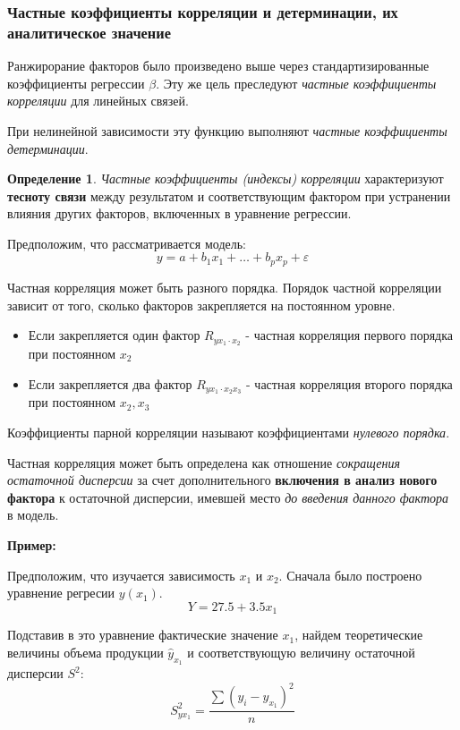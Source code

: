 \documentclass[aps,%
12pt,%
final,%
oneside,
onecolumn,%
musixtex, %
superscriptaddress,%
centertags]{article} %
\theoremstyle{plain}
\theoremstyle{definition}
\newtheorem{definition}{Определение}[subsection]
\theoremstyle{remark}
\begin{document}
\newpage
\subsubsection{Частные коэффициенты корреляции и детерминации, их аналитическое значение}

Ранжирорание факторов было произведено выше через стандартизированные коэффициенты регрессии $\beta$. Эту же цель преследуют \textit{частные коэффициенты корреляции} для линейных связей.

При нелинейной зависимости эту функцию выполняют \textit{частные коэффициенты детерминации}.

\begin{definition}
	\textit{Частные коэффициенты (индексы) корреляции} характеризуют \textbf{тесноту связи} между результатом и соответствующим фактором при устранении влияния других факторов, включенных в уравнение регрессии. 
\end{definition}

Предположим, что рассматривается модель:
$$y=a +b_1x_1 + \ldots + b_px_p + \varepsilon $$

Частная корреляция может быть разного порядка. Порядок частной корреляции зависит от того, сколько факторов закрепляется на постоянном уровне. 
\begin{itemize}
	\item Если закрепляется один фактор $R_{yx_1 \cdot x_2}$ - частная корреляция первого порядка при постоянном $x_2$
	\item Если закрепляется два фактор $R_{yx_1 \cdot x_2x_3}$ - частная корреляция второго порядка при постоянном $x_2,x_3$
\end{itemize}

Коэффициенты парной корреляции называют коэффициентами \textit{нулевого порядка}.

Частная корреляция может быть определена как отношение \textit{сокращения остаточной дисперсии} за счет дополнительного \textbf{включения в анализ нового фактора} к остаточной дисперсии, имевшей место \textit{до введения данного фактора} в модель.

\textbf{Пример:}

Предположим, что изучается зависимость $x_1$ и $x_2$. Сначала было построено уравнение регресии $y(x_1)$.
$$Y = 27.5 +3.5x_1$$

Подставив в это уравнение фактические значение $x_1$, найдем теоретические величины объема продукции $\hat{y}_{x_1}$ и соответствующую величину остаточной дисперсии $S^2$:
$$S_{yx_1}^2 = \frac{\sum (y_i - \hat{y}_{x_1})^2}{n}$$
\end{document}
